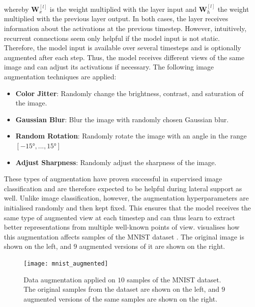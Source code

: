 whereby $\boldsymbol{W}_x^{[l]}$ is the weight multiplied with the layer input and $\boldsymbol{W}_h^{[l]}$ the weight multiplied with the previous layer output. In both cases, the layer receives information about the activations at the previous timestep.
However, intuitively, recurrent connections seem only helpful if the model input is not static. Therefore, the model input is available over several timesteps and is optionally augmented after each step. Thus, the model receives different views of the same image and can adjust its activations if necessary. The following image augmentation techniques are applied:

\begin{itemize}
	\item \textbf{Color Jitter}: Randomly change the brightness, contrast, and saturation of the image.
	\item \textbf{Gaussian Blur}: Blur the image with randomly chosen Gaussian blur.
	\item \textbf{Random Rotation}: Randomly rotate the image with an angle in the range $[-15°, ..., 15°]$
	\item \textbf{Adjust Sharpness}: Randomly adjust the sharpness of the image.
\end{itemize}

These types of augmentation have proven successful in supervised image classification and are therefore expected to be helpful during lateral support as well.
Unlike image classification, however, the augmentation hyperparameters are initialised randomly and then kept fixed. This ensures that the model receives the same type of augmented view at each timestep and can thus learn to extract better representations from multiple well-known points of view. 
 visualises how this augmentation affects samples of the MNIST dataset \cite{Lecun_Bottou_Bengio_Haffner_1998}. The original image is shown on the left, and $9$ augmented versions of it are shown on the right.

\begin{figure}[h]
    \centering
    \texttt{[image: mnist\_augmented]}
    \caption[Data augmentation applied on $10$ samples of the MNIST dataset]{Data augmentation applied on $10$ samples of the MNIST dataset. The original samples from the dataset are shown on the left, and $9$ augmented versions of the same samples are shown on the right.}
\end{figure}


